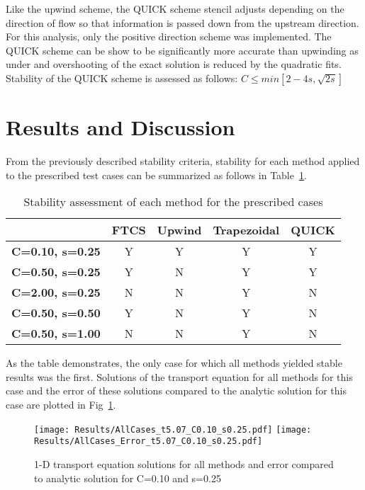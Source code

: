 \documentclass[twocolumn,10pt]{asme2ej}
\begin{document}
Like the upwind scheme, the QUICK scheme stencil adjusts depending on the direction of flow so that information is passed down from the upstream direction.  For this analysis, only the positive direction scheme was implemented.  The QUICK scheme can be show to be significantly more accurate than upwinding as under and overshooting of the exact solution is reduced by the quadratic fits.  Stability of the QUICK scheme is assessed as follows:  $C \leq min[2-4s, \sqrt{2s}]$

\section{Results and Discussion}

From the previously described stability criteria, stability for each method applied to the prescribed test cases can be summarized as follows in Table~\ref{Stability}.

\begin{table}[htb]
\begin{center}
\label{Stability}
\begin{tabular}{|c | c c c c|}
\hline
{} & \textbf{FTCS} & \textbf{Upwind} & \textbf{Trapezoidal} & \textbf{QUICK} \\
\hline
\textbf{C=0.10, s=0.25} & Y & Y & Y & Y \\
\textbf{C=0.50, s=0.25} & Y & N & Y & Y \\
\textbf{C=2.00, s=0.25} & N & N & Y & N \\
\textbf{C=0.50, s=0.50} & Y & N & Y & N \\
\textbf{C=0.50, s=1.00} & N & N & Y & N \\
\hline
\end{tabular}
\caption{Stability assessment of each method for the prescribed cases}
\end{center}
\end{table}

As the table demonstrates, the only case for which all methods yielded stable results was the first.  Solutions of the transport equation for all methods for this case and the error of these solutions compared to the analytic solution for this case are plotted in Fig~\ref{CasesPlot}.

\begin{figure}[htb]
\begin{center}
\texttt{[image: Results/AllCases\_t5.07\_C0.10\_s0.25.pdf]}
\texttt{[image: Results/AllCases\_Error\_t5.07\_C0.10\_s0.25.pdf]}
\caption{1-D transport equation solutions for all methods and error compared to analytic solution for C=0.10 and s=0.25}
\label{CasesPlot}
\end{center}
\end{figure}
\end{document}
